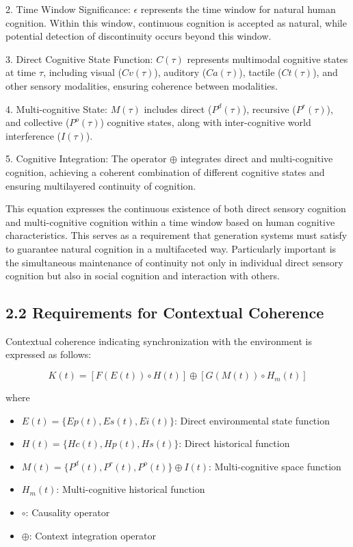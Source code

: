 \documentclass{article}
\begin{document}
2. Time Window Significance: $\epsilon$ represents the time window for natural human cognition. Within this window, continuous cognition is accepted as natural, while potential detection of discontinuity occurs beyond this window.

3. Direct Cognitive State Function: $C(\tau)$ represents multimodal cognitive states at time $\tau$, including visual ($Cv(\tau)$), auditory ($Ca(\tau)$), tactile ($Ct(\tau)$), and other sensory modalities, ensuring coherence between modalities.

4. Multi-cognitive State: $M(\tau)$ includes direct ($P^d(\tau)$), recursive ($P^r(\tau)$), and collective ($P^o(\tau)$) cognitive states, along with inter-cognitive world interference ($I(\tau)$).

5. Cognitive Integration: The operator $\oplus$ integrates direct and multi-cognitive cognition, achieving a coherent combination of different cognitive states and ensuring multilayered continuity of cognition.

This equation expresses the continuous existence of both direct sensory cognition and multi-cognitive cognition within a time window based on human cognitive characteristics. This serves as a requirement that generation systems must satisfy to guarantee natural cognition in a multifaceted way. Particularly important is the simultaneous maintenance of continuity not only in individual direct sensory cognition but also in social cognition and interaction with others.

\subsection{2.2 Requirements for Contextual Coherence}

Contextual coherence indicating synchronization with the environment is expressed as follows:

$$
K(t) = [F(E(t)) \circ H(t)] \oplus [G(M(t)) \circ H_m(t)]
$$

where
\begin{itemize}
    \item $E(t) = \{Ep(t), Es(t), Ei(t)\}$: Direct environmental state function
    \item $H(t) = \{Hc(t), Hp(t), Hs(t)\}$: Direct historical function
    \item $M(t) = \{P^d(t), P^r(t), P^o(t)\} \oplus I(t)$: Multi-cognitive space function
    \item $H_m(t)$: Multi-cognitive historical function
    \item $\circ$: Causality operator
    \item $\oplus$: Context integration operator
\end{itemize}
\end{document}
